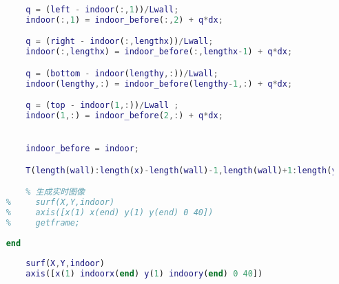 \begin{lstlisting}[language = matlab]
        % 墙壁隔热
        q = (left - indoor(:,1))/Lwall;
        indoor(:,1) = indoor_before(:,2) + q*dx;

        q = (right - indoor(:,lengthx))/Lwall;
        indoor(:,lengthx) = indoor_before(:,lengthx-1) + q*dx;

        q = (bottom - indoor(lengthy,:))/Lwall;
        indoor(lengthy,:) = indoor_before(lengthy-1,:) + q*dx;

        q = (top - indoor(1,:))/Lwall ;
        indoor(1,:) = indoor_before(2,:) + q*dx;


        indoor_before = indoor;

        T(length(wall):length(x)-length(wall)-1,length(wall)+1:length(y)-length(wall)) = indoor;

        % 生成实时图像
    %     surf(X,Y,indoor)
    %     axis([x(1) x(end) y(1) y(end) 0 40])
    %     getframe;
        
    end
        
        surf(X,Y,indoor)
        axis([x(1) indoorx(end) y(1) indoory(end) 0 40])
\end{lstlisting}
